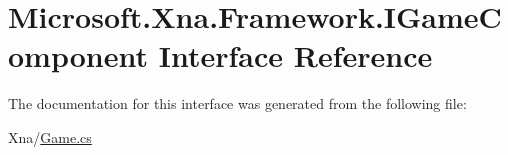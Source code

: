 \hypertarget{interface_microsoft_1_1_xna_1_1_framework_1_1_i_game_component}{}\section{Microsoft.\+Xna.\+Framework.\+I\+Game\+Component Interface Reference}
\label{interface_microsoft_1_1_xna_1_1_framework_1_1_i_game_component}


The documentation for this interface was generated from the following file\+:\begin{DoxyCompactItemize}
\item 
Xna/\hyperlink{_game_8cs}{Game.\+cs}\end{DoxyCompactItemize}
